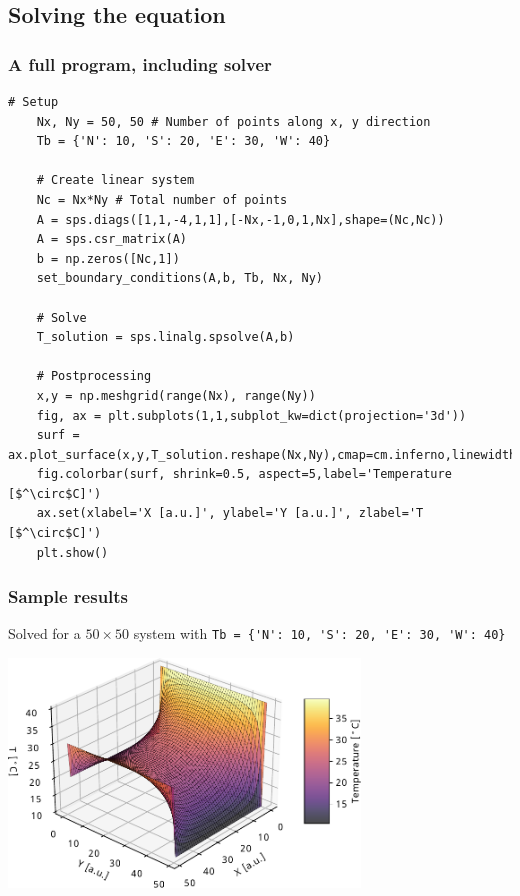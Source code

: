 \subsection*{Solving the equation}
\begin{frame}[fragile]
  \frametitle{A full program, including solver}
  \begin{lstlisting}[linewidth=1.05\textwidth]
    # Setup
    Nx, Ny = 50, 50 # Number of points along x, y direction
    Tb = {'N': 10, 'S': 20, 'E': 30, 'W': 40}
    
    # Create linear system
    Nc = Nx*Ny # Total number of points
    A = sps.diags([1,1,-4,1,1],[-Nx,-1,0,1,Nx],shape=(Nc,Nc))
    A = sps.csr_matrix(A)
    b = np.zeros([Nc,1])
    set_boundary_conditions(A,b, Tb, Nx, Ny)
    
    # Solve
    T_solution = sps.linalg.spsolve(A,b)
    
    # Postprocessing
    x,y = np.meshgrid(range(Nx), range(Ny))
    fig, ax = plt.subplots(1,1,subplot_kw=dict(projection='3d'))
    surf = ax.plot_surface(x,y,T_solution.reshape(Nx,Ny),cmap=cm.inferno,linewidth=0.1,edgecolor='black')
    fig.colorbar(surf, shrink=0.5, aspect=5,label='Temperature [$^\circ$C]')
    ax.set(xlabel='X [a.u.]', ylabel='Y [a.u.]', zlabel='T [$^\circ$C]')
    plt.show()
  \end{lstlisting}
\end{frame}
  
\begin{frame}[fragile]
  \frametitle{Sample results}
  Solved for a $50\times50$ system with \lstinline$Tb = {'N': 10, 'S': 20, 'E': 30, 'W': 40}$
  \begin{center}
    \includegraphics[width=0.7\textwidth]{laplace_py_50x50}
  \end{center}
\end{frame}

